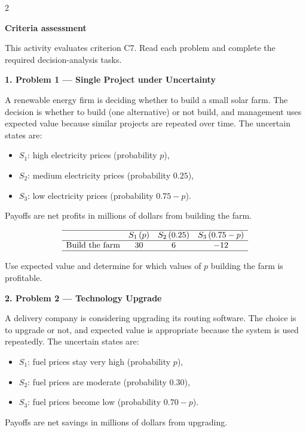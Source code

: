 \documentclass[12pt]{article}
\newcommand{\SubsectionBox}[1]{%
	\noindent\colorbox{gray!30}{%
		\parbox{\linewidth}{\textbf{#1}}%
	}\par\vspace{0.35cm}%
}
\begin{document}
	\begin{multicols}{2}
		\SubsectionBox{Criteria assessment}\vspace{-0.25cm}
		This activity evaluates criterion C7. Read each problem and complete the required decision-analysis tasks.

		\vspace{0.25cm}
		\SubsectionBox{1. Problem 1 --- Single Project under Uncertainty}\vspace{-0.25cm}
		A renewable energy firm is deciding whether to build a small solar farm. The decision is whether to build (one alternative) or not build, and management uses expected value because similar projects are repeated over time. The uncertain states are:
				\begin{itemize}
					\item \(S_1\): high electricity prices (probability \(p\)),
					\item \(S_2\): medium electricity prices (probability \(0.25\)),
					\item \(S_3\): low electricity prices (probability \(0.75-p\)).
				\end{itemize}
				Payoffs are net profits in millions of dollars from building the farm.
				
				\[
				\begin{array}{lccc}
					\hline
					& S_1\,(p) & S_2\,(0.25) & S_3\,(0.75-p) \\
					\hline
					\mbox{Build the farm} & 30 & 6 & -12 \\
					\hline
				\end{array}
				\]
				
				Use expected value and determine for which values of \(p\) building the farm is profitable.

		\vspace{0.25cm}
		\SubsectionBox{2. Problem 2 --- Technology Upgrade}\vspace{-0.25cm}
		A delivery company is considering upgrading its routing software. The choice is to upgrade or not, and expected value is appropriate because the system is used repeatedly. The uncertain states are:
				\begin{itemize}
					\item \(S_1\): fuel prices stay very high (probability \(p\)),
					\item \(S_2\): fuel prices are moderate (probability \(0.30\)),
					\item \(S_3\): fuel prices become low (probability \(0.70-p\)).
				\end{itemize}
				Payoffs are net savings in millions of dollars from upgrading.
				

\end{multicols}
\end{document}
